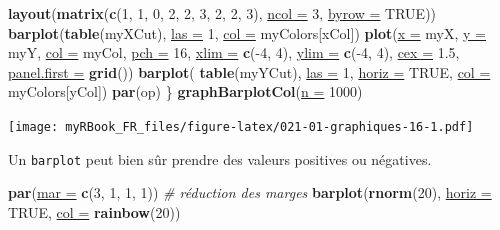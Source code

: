 \documentclass[twoside,symmetric]{book}
\newenvironment{Shaded}{}{}
\newcommand{\CommentTok}[1]{\textit{#1}}
\newcommand{\DataTypeTok}[1]{\underline{#1}}
\newcommand{\DecValTok}[1]{#1}
\newcommand{\FloatTok}[1]{#1}
\newcommand{\KeywordTok}[1]{\textbf{#1}}
\newcommand{\NormalTok}[1]{#1}
\newcommand{\OperatorTok}[1]{#1}
\newcommand{\OtherTok}[1]{#1}
\begin{document}
\begin{Shaded}
\begin{Highlighting}[]
  \KeywordTok{layout}\NormalTok{(}\KeywordTok{matrix}\NormalTok{(}\KeywordTok{c}\NormalTok{(}\DecValTok{1}\NormalTok{, }\DecValTok{1}\NormalTok{, }\DecValTok{0}\NormalTok{, }
                  \DecValTok{2}\NormalTok{, }\DecValTok{2}\NormalTok{, }\DecValTok{3}\NormalTok{, }
                  \DecValTok{2}\NormalTok{, }\DecValTok{2}\NormalTok{, }\DecValTok{3}\NormalTok{), }\DataTypeTok{ncol =} \DecValTok{3}\NormalTok{, }\DataTypeTok{byrow =} \OtherTok{TRUE}\NormalTok{))}
  \KeywordTok{barplot}\NormalTok{(}\KeywordTok{table}\NormalTok{(myXCut), }\DataTypeTok{las =} \DecValTok{1}\NormalTok{, }\DataTypeTok{col =}\NormalTok{ myColors[xCol])}
  \KeywordTok{plot}\NormalTok{(}\DataTypeTok{x =}\NormalTok{ myX, }\DataTypeTok{y =}\NormalTok{ myY, }\DataTypeTok{col =}\NormalTok{ myCol, }\DataTypeTok{pch =} \DecValTok{16}\NormalTok{, }
    \DataTypeTok{xlim =} \KeywordTok{c}\NormalTok{(}\OperatorTok{-}\DecValTok{4}\NormalTok{, }\DecValTok{4}\NormalTok{), }\DataTypeTok{ylim =} \KeywordTok{c}\NormalTok{(}\OperatorTok{-}\DecValTok{4}\NormalTok{, }\DecValTok{4}\NormalTok{), }\DataTypeTok{cex =} \FloatTok{1.5}\NormalTok{, }
    \DataTypeTok{panel.first =} \KeywordTok{grid}\NormalTok{())}
  \KeywordTok{barplot}\NormalTok{(}
    \KeywordTok{table}\NormalTok{(myYCut), }
    \DataTypeTok{las =} \DecValTok{1}\NormalTok{, }
    \DataTypeTok{horiz =} \OtherTok{TRUE}\NormalTok{, }
    \DataTypeTok{col =}\NormalTok{ myColors[yCol])}
  \KeywordTok{par}\NormalTok{(op)}
\NormalTok{\}}
\KeywordTok{graphBarplotCol}\NormalTok{(}\DataTypeTok{n =} \DecValTok{1000}\NormalTok{)}
\end{Highlighting}
\end{Shaded}

\texttt{[image: myRBook\_FR\_files/figure-latex/021-01-graphiques-16-1.pdf]}

Un \texttt{barplot} peut bien sûr prendre des valeurs positives ou négatives.

\begin{Shaded}
\begin{Highlighting}[]
\KeywordTok{par}\NormalTok{(}\DataTypeTok{mar =} \KeywordTok{c}\NormalTok{(}\DecValTok{3}\NormalTok{, }\DecValTok{1}\NormalTok{, }\DecValTok{1}\NormalTok{, }\DecValTok{1}\NormalTok{)) }\CommentTok{# réduction des marges}
\KeywordTok{barplot}\NormalTok{(}\KeywordTok{rnorm}\NormalTok{(}\DecValTok{20}\NormalTok{), }\DataTypeTok{horiz =} \OtherTok{TRUE}\NormalTok{, }\DataTypeTok{col =} \KeywordTok{rainbow}\NormalTok{(}\DecValTok{20}\NormalTok{))}
\end{Highlighting}
\end{Shaded}
\end{document}
